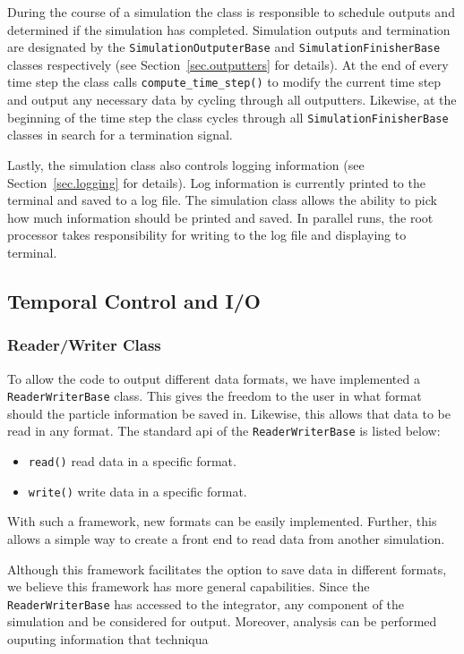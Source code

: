 During the course of a simulation the class is responsible to schedule outputs and
determined if the simulation has completed. Simulation outputs and termination are 
designated by the \lstinline{SimulationOutputerBase} and \lstinline{SimulationFinisherBase} 
classes respectively (see Section~\ref{sec.outputters} for details). At the end of every time
step the class calls \lstinline{compute_time_step()} to modify the current time step and
output any necessary data by cycling through all outputters. Likewise, at the beginning of
the time step the class cycles through all \lstinline{SimulationFinisherBase} classes 
in search for a termination signal.

Lastly, the simulation class also controls logging information (see Section~\ref{sec.logging}
for details). 
Log information is currently printed to the terminal and saved to a log file. The simulation class 
allows the ability to pick how much information should be printed and saved. In parallel runs, the 
root processor takes responsibility for writing to the log file and displaying to terminal.


\subsection{Temporal Control and I/O}
\subsubsection{Reader/Writer Class}
To allow the code to output different data formats, we have implemented 
a \lstinline{ReaderWriterBase} class. This gives the freedom to the user
in what format should the particle information be saved in. Likewise, this
allows that data to be read in any format. The standard api of the 
\lstinline{ReaderWriterBase} is listed below:
\begin{itemize}
	\item \lstinline{read()} read data in a specific format.
    \item \lstinline{write()} write data in a specific format.
\end{itemize}
With such a framework, new formats can be easily implemented. Further, this
allows a simple way to create a front end to read data from another simulation.

Although this framework facilitates the option to save data in different formats,
we believe this framework has more general capabilities. Since the \lstinline{ReaderWriterBase}
has accessed to the integrator, any component of the simulation and be considered for
output. Moreover, analysis can be performed ouputing information that techniqua

